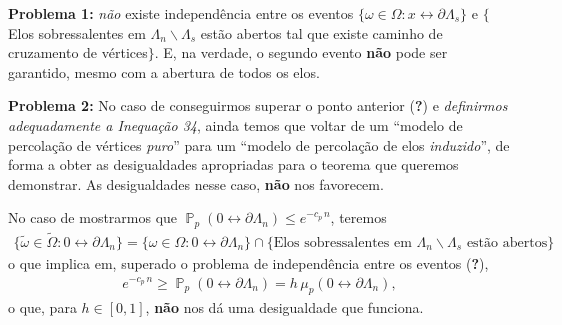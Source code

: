 \documentclass[12pt, a4paper]{article}
\DeclareMathOperator{\PX}{\mathbb{P}} %
\theoremstyle{definition} %
\begin{document}
	\textbf{Problema 1:} \textit{não} existe independência entre os eventos $\{\omega \in \Omega : x \leftrightarrow \partial\Lambda_s\}$ e $\{$Elos sobressalentes em $\Lambda_n \backslash \Lambda_s$ estão abertos tal que existe caminho de cruzamento de vértices$\}$. E, na verdade, o segundo evento \textbf{não} pode ser garantido, mesmo com a abertura de todos os elos.
	
	\textbf{Problema 2:} No caso de conseguirmos superar o ponto anterior {\color{red}(\textbf{?})} e \textit{definirmos adequadamente a Inequação 34}, ainda temos que voltar de um ``modelo de percolação de vértices \textit{puro}'' para um ``modelo de percolação de elos \textit{induzido}'', de forma a obter as desigualdades apropriadas para o teorema que queremos demonstrar. As desigualdades nesse caso, \textbf{não} nos favorecem.
	
	No caso de mostrarmos que $\PX_p(0 \leftrightarrow \partial\Lambda_n) \leq e^{-c_p\,n}$, teremos
	\begin{align*}
	\{\tilde{\omega}\in\tilde{\Omega}:0 \leftrightarrow \partial\Lambda_n\} = \{\omega \in \Omega : 0 \leftrightarrow \partial\Lambda_n\} \cap \{\text{Elos sobressalentes em } \Lambda_n \backslash \Lambda_s \text{ estão abertos}\}
	\end{align*}
	o que implica em, superado o problema de independência entre os eventos {\color{red}(\textbf{?})},
	\begin{align*}
		e^{-c_p\,n} \geq \PX_p(0 \leftrightarrow \partial\Lambda_n) = h \, \mu_p(0 \leftrightarrow \partial\Lambda_n),
	\end{align*}
	o que, para $h \in [0, 1]$, \textbf{não} nos dá uma desigualdade que funciona.
	
\end{document}
